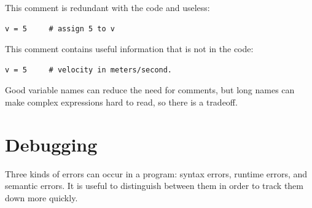 \documentclass[10pt]{book}
\begin{document}
This comment is redundant with the code and useless:

\begin{verbatim}
v = 5     # assign 5 to v
\end{verbatim}
%
This comment contains useful information that is not in the code:

\begin{verbatim}
v = 5     # velocity in meters/second. 
\end{verbatim}
%
Good variable names can reduce the need for comments, but
long names can make complex expressions hard to read, so there is
a tradeoff.


\section{Debugging}

Three kinds of errors can occur in a program: syntax errors, runtime 
errors, and semantic errors.  It is useful
to distinguish between them in order to track them down more quickly.
\end{document}
